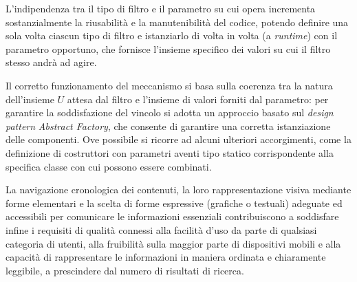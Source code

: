 L'indipendenza tra il tipo di filtro e il parametro su cui opera incrementa sostanzialmente la riusabilità e la manutenibilità del codice, potendo definire una sola volta ciascun tipo di filtro e istanziarlo di volta in volta (a \textit{runtime}) con il parametro opportuno, che fornisce l'insieme specifico dei valori su cui il filtro stesso andrà ad agire.   

Il corretto funzionamento del meccanismo si basa sulla coerenza tra la natura dell'insieme $U$ attesa dal filtro e l'insieme di valori forniti dal parametro: per garantire la soddisfazione del vincolo si adotta un approccio basato sul \textit{design pattern} \textit{Abstract Factory}, che consente di garantire una corretta istanziazione delle componenti. Ove possibile si ricorre ad alcuni ulteriori accorgimenti, come la definizione di costruttori con parametri aventi tipo statico corrispondente alla specifica classe con cui possono essere combinati.

La navigazione cronologica dei contenuti, la loro rappresentazione visiva mediante forme elementari e la scelta di forme espressive (grafiche o testuali) adeguate ed accessibili per comunicare le informazioni essenziali contribuiscono a soddisfare infine i requisiti di qualità connessi alla facilità d'uso da parte di qualsiasi categoria di utenti, alla fruibilità sulla maggior parte di dispositivi mobili e alla capacità di rappresentare le informazioni in maniera ordinata e chiaramente leggibile, a prescindere dal numero di risultati di ricerca.